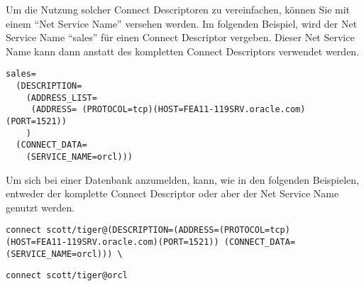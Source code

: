           Um die Nutzung solcher Connect Descriptoren zu vereinfachen, können Sie mit einem \enquote{Net Service Name} versehen werden. Im folgenden Beispiel, wird der Net Service Name \enquote{sales} für einen Connect Descriptor vergeben. Dieser Net Service Name kann dann anstatt des kompletten Connect Descriptors verwendet werden.
          \begin{lstlisting}[caption={Aufbau eines Net Service Names},label=admin609,language=configfile]
sales=
  (DESCRIPTION=
    (ADDRESS_LIST=
     (ADDRESS= (PROTOCOL=tcp)(HOST=FEA11-119SRV.oracle.com)(PORT=1521))
    )
  (CONNECT_DATA=
    (SERVICE_NAME=orcl)))
          \end{lstlisting}
          Um sich bei einer Datenbank anzumelden, kann, wie in den folgenden
          Beispielen, entweder der komplette Connect Descriptor oder aber der
          Net Service Name genutzt werden.
          \begin{lstlisting}[caption={Verwendung eines Connect Descriptors als Connect Identifier},label=admin610,language=sqlplus,alsolanguage=terminal]
connect scott/tiger@(DESCRIPTION=(ADDRESS=(PROTOCOL=tcp)
(HOST=FEA11-119SRV.oracle.com)(PORT=1521)) (CONNECT_DATA=(SERVICE_NAME=orcl))) \
          \end{lstlisting}
          \begin{lstlisting}[caption={Verwendung eines Net Service Name als Connect Identifier},label=admin611,language=sqlplus]
connect scott/tiger@orcl
          \end{lstlisting}
